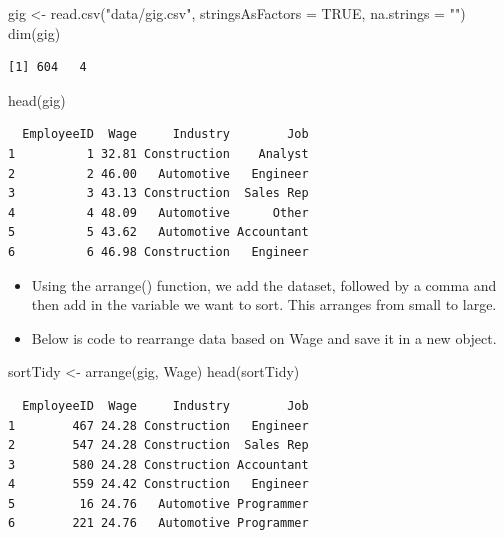 \documentclass[
  letterpaper,
  DIV=11,
  numbers=noendperiod]{scrreprt}
\newenvironment{Shaded}{\begin{snugshade}}{\end{snugshade}}
\newcommand{\AttributeTok}[1]{\textcolor[rgb]{0.40,0.45,0.13}{#1}}
\newcommand{\ConstantTok}[1]{\textcolor[rgb]{0.56,0.35,0.01}{#1}}
\newcommand{\FunctionTok}[1]{\textcolor[rgb]{0.28,0.35,0.67}{#1}}
\newcommand{\NormalTok}[1]{\textcolor[rgb]{0.00,0.23,0.31}{#1}}
\newcommand{\OtherTok}[1]{\textcolor[rgb]{0.00,0.23,0.31}{#1}}
\newcommand{\StringTok}[1]{\textcolor[rgb]{0.13,0.47,0.30}{#1}}
\begin{document}
\begin{Shaded}
\begin{Highlighting}[]
\NormalTok{gig }\OtherTok{\textless{}{-}} \FunctionTok{read.csv}\NormalTok{(}\StringTok{"data/gig.csv"}\NormalTok{, }\AttributeTok{stringsAsFactors =} \ConstantTok{TRUE}\NormalTok{, }\AttributeTok{na.strings =} \StringTok{""}\NormalTok{)}
\FunctionTok{dim}\NormalTok{(gig)}
\end{Highlighting}
\end{Shaded}

\begin{verbatim}
[1] 604   4
\end{verbatim}

\begin{Shaded}
\begin{Highlighting}[]
\FunctionTok{head}\NormalTok{(gig)}
\end{Highlighting}
\end{Shaded}

\begin{verbatim}
  EmployeeID  Wage     Industry        Job
1          1 32.81 Construction    Analyst
2          2 46.00   Automotive   Engineer
3          3 43.13 Construction  Sales Rep
4          4 48.09   Automotive      Other
5          5 43.62   Automotive Accountant
6          6 46.98 Construction   Engineer
\end{verbatim}

\begin{itemize}
\item
  Using the arrange() function, we add the dataset, followed by a comma
  and then add in the variable we want to sort. This arranges from small
  to large.
\item
  Below is code to rearrange data based on Wage and save it in a new
  object.
\end{itemize}

\begin{Shaded}
\begin{Highlighting}[]
\NormalTok{sortTidy }\OtherTok{\textless{}{-}} \FunctionTok{arrange}\NormalTok{(gig, Wage)}
\FunctionTok{head}\NormalTok{(sortTidy)}
\end{Highlighting}
\end{Shaded}

\begin{verbatim}
  EmployeeID  Wage     Industry        Job
1        467 24.28 Construction   Engineer
2        547 24.28 Construction  Sales Rep
3        580 24.28 Construction Accountant
4        559 24.42 Construction   Engineer
5         16 24.76   Automotive Programmer
6        221 24.76   Automotive Programmer
\end{verbatim}
\end{document}
